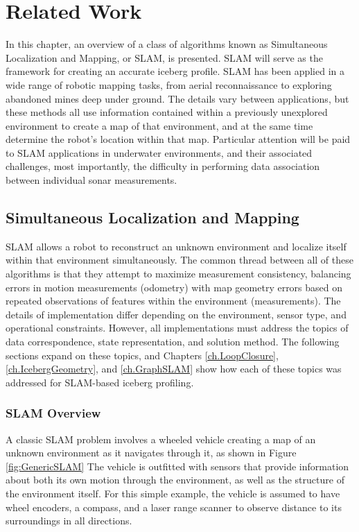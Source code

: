 
\chapter{Related Work}
\label{ch.RelatedWork}

In this chapter, an overview of a class of algorithms known as Simultaneous Localization and Mapping, or SLAM, is presented. SLAM will serve as the framework for creating an accurate iceberg profile. SLAM has been applied  in a wide range of robotic mapping tasks, from aerial reconnaissance to exploring abandoned mines deep under ground. The details vary between applications, but these methods all use information contained within a previously unexplored environment to create a map of that environment, and at the same time determine the robot's location within that map. Particular attention will be paid to SLAM applications in underwater environments, and their associated challenges, most importantly, the difficulty in performing data association between individual sonar measurements. 

\section{Simultaneous Localization and Mapping}
\label{sec.SLAM}

SLAM allows a robot to reconstruct an unknown environment and localize itself within that environment simultaneously.  The common thread between all of these algorithms is that they attempt to maximize measurement consistency, balancing errors in motion measurements (odometry) with map geometry errors based on repeated observations of features within the environment (measurements). The details of implementation differ depending on the environment, sensor type, and operational constraints. However, all implementations must address the topics of data correspondence, state representation, and solution method. The following sections expand on these topics, and Chapters \ref{ch.LoopClosure}, \ref{ch.IcebergGeometry}, and \ref{ch.GraphSLAM} show how each of these topics was addressed for SLAM-based iceberg profiling.

\subsection{SLAM Overview}

\label{sec:genericSLAM}
A classic SLAM problem involves a wheeled vehicle creating a map of an unknown environment as it navigates through it, as shown in Figure \ref{fig:GenericSLAM} The vehicle is outfitted with sensors that provide information about both its own motion through the environment, as well as the structure of the environment itself. For this simple example, the vehicle is assumed to have wheel encoders, a compass, and a laser range scanner to observe distance to its surroundings in all directions.

